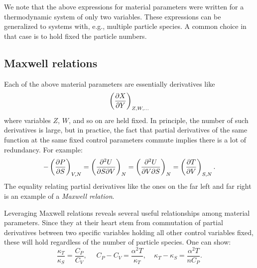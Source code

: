 We note that the above expressions for material parameters were
written for a thermodynamic system of only two variables. These expressions
can be generalized to systems with, e.g., multiple particle species.
A common choice in that case is to hold fixed the particle numbers.


\subsection{Maxwell relations}

Each of the above material parameters are essentially derivatives like
\begin{equation}
\left(\pdv{X}{Y}\right)_{Z,W,...}
\end{equation}
where variables $Z$, $W$, and so on are held fixed. In principle, the
number of such derivatives is large, but in practice, the fact
that partial derivatives of the same function at the same fixed
control parameters commute implies there is a lot of redundancy. 
For example:
\begin{equation}
-\left(\pdv{P}{S}\right)_{V,N}
=\left(\frac{\partial^2 U}{\partial S\partial V}\right)_{N}
=\left(\frac{\partial^2 U}{\partial V\partial S}\right)_{N}
=\left(\pdv{T}{V}\right)_{S,N}.
\end{equation}
The equality relating partial derivatives like the ones on the far left
and far right is an example of a {\it Maxwell relation}.

Leveraging Maxwell relations reveals several useful relationships
among material parameters. Since they at their heart stem from
commutation of partial derivatives between two specific variables holding
all other control variables fixed, these will hold regardless of
the number of particle species. One can show:
\begin{equation}\label{eq:matparamconstraints}
 \frac{\kappa_T}{\kappa_S}=\frac{C_P}{C_V},~~~~~~ C_P-C_V=\frac{\alpha^2
T}{\kappa_T}, ~~~~~
 \kappa_T-\kappa_S=\frac{\alpha^2 T}{n C_P}.
\end{equation}

